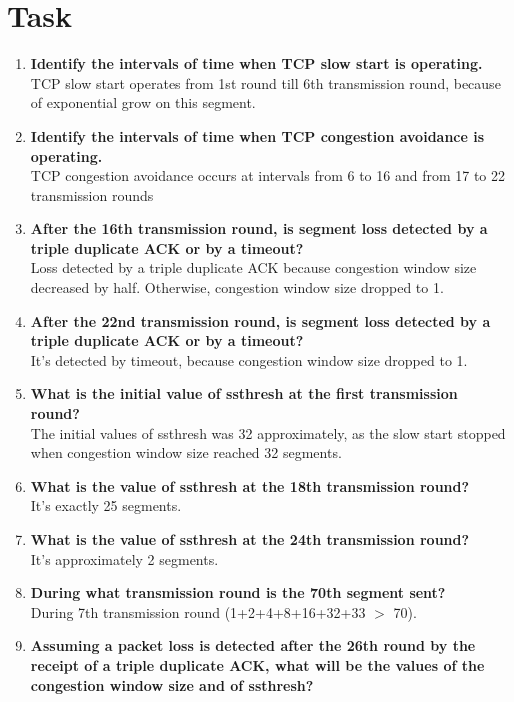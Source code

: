 \documentclass[11pt]{article}
\begin{document}
    \section{Task}\label{sec:task_3}
    \begin{enumerate}[label=(\alph*)]
        \item \textbf{Identify the intervals of time when TCP slow start is operating.}\\
        TCP slow start operates from 1st round till 6th transmission round, because of exponential grow on this segment.
        \item \textbf{Identify the intervals of time when TCP congestion avoidance is operating.} \\
        TCP congestion avoidance occurs at intervals from 6 to 16 and from 17 to 22 transmission rounds
        \item \textbf{After the 16th transmission round, is segment loss detected by a triple duplicate ACK or by a timeout?} \\
        Loss detected by a triple duplicate ACK because congestion window size decreased by half. Otherwise, congestion window size dropped to 1.
        \item \textbf{After the 22nd transmission round, is segment loss detected by a triple duplicate ACK or by a timeout?} \\
        It's detected by timeout, because congestion window size dropped to 1.
        \item \textbf{What is the initial value of ssthresh at the first transmission round?} \\
        The initial values of ssthresh was 32 approximately, as the slow start stopped when congestion window size reached 32 segments.
        \item \textbf{What is the value of ssthresh at the 18th transmission round?} \\
        It's exactly 25 segments.
        \item \textbf{What is the value of ssthresh at the 24th transmission round?} \\
        It's approximately 2 segments.
        \item \textbf{During what transmission round is the 70th segment sent?} \\
        During 7th transmission round (1+2+4+8+16+32+33 $>$ 70).
        \item \textbf{Assuming a packet loss is detected after the 26th round by the receipt of a triple duplicate ACK, what will be the values of the congestion window size and of ssthresh?} \\

\end{enumerate}
\end{document}
